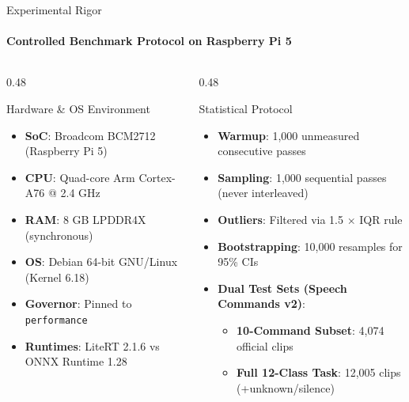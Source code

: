 \documentclass[aspectratio=169]{beamer}
\begin{document}
\begin{frame}{Experimental Rigor}
\framesubtitle{Controlled Benchmark Protocol on Raspberry Pi 5}
\begin{columns}[T]
  \begin{column}{0.48\textwidth}
    \begin{block}{Hardware \& OS Environment}
      \begin{itemize}\small
        \item \textbf{SoC}: Broadcom BCM2712 (Raspberry Pi 5)
        \item \textbf{CPU}: Quad-core Arm Cortex-A76 @ 2.4 GHz
        \item \textbf{RAM}: 8 GB LPDDR4X (synchronous)
        \item \textbf{OS}: Debian 64-bit GNU/Linux (Kernel 6.18)
        \item \textbf{Governor}: Pinned to \texttt{performance}
        \item \textbf{Runtimes}: LiteRT 2.1.6 vs ONNX Runtime 1.28
      \end{itemize}
    \end{block}
  \end{column}

  \begin{column}{0.48\textwidth}
    \begin{block}{Statistical Protocol}
      \begin{itemize}\small
        \item \textbf{Warmup}: 1,000 unmeasured consecutive passes
        \item \textbf{Sampling}: 1,000 sequential passes (never interleaved)
        \item \textbf{Outliers}: Filtered via 1.5 $\times$ IQR rule
        \item \textbf{Bootstrapping}: 10,000 resamples for 95\% CIs
        \item \textbf{Dual Test Sets (Speech Commands v2)}:
          \begin{itemize}\footnotesize
            \item \textbf{10-Command Subset}: 4,074 official clips
            \item \textbf{Full 12-Class Task}: 12,005 clips (+unknown/silence)
          \end{itemize}
      \end{itemize}
    \end{block}
  \end{column}
\end{columns}
\end{frame}
\end{document}
